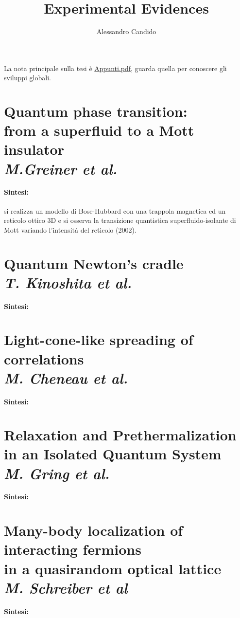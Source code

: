 \documentclass[a4paper,10pt]{article}
\title{Experimental Evidences}
\author{Alessandro Candido}
\begin{document}
\maketitle
\tableofcontents

\section*{}

La nota principale sulla tesi è \href{./Appunti.pdf}{Appunti.pdf}, guarda quella per conoscere gli sviluppi globali.

\section{Quantum phase transition: \\ from a superfluid to a Mott insulator \\ \textit{M.Greiner et al.}}

\paragraph{Sintesi:} si realizza un modello di Bose-Hubbard con una trappola magnetica ed un reticolo ottico 3D e si osserva la transizione quantistica superfluido-isolante di Mott variando l'intensità del reticolo (2002).

\section{Quantum Newton's cradle \\ \textit{T. Kinoshita et al.}}

\paragraph{Sintesi:}

\section{Light-cone-like spreading of correlations \\ \textit{M. Cheneau et al.}}

\paragraph{Sintesi:}

\section{Relaxation and Prethermalization \\ in an Isolated Quantum System \\ \textit{M. Gring et al.}}

\paragraph{Sintesi:}

\section{Many-body localization of interacting fermions \\ in a quasirandom optical lattice\\ \textit{M. Schreiber et al}}

\paragraph{Sintesi:}
\end{document}
